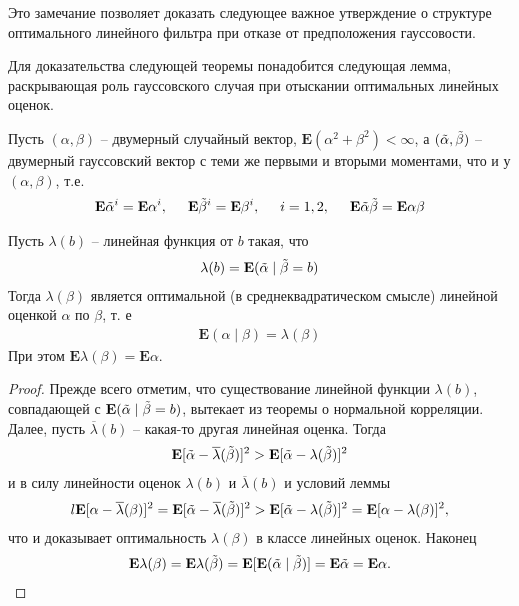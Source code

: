 Это замечание позволяет доказать следующее важное утверждение о
структуре оптимального линейного фильтра при отказе от предположения
гауссовости.

Для доказательства следующей теоремы понадобится следующая лемма, раскрывающая роль гауссовского случая при отыскании оптимальных линейных оценок.

\begin{lemma}\label{lost_minus_lemma_2}
	Пусть $(\alpha, \beta)$ – двумерный случайный вектор, $\mathbf{E} (\alpha^2 + \beta^2) < \infty$, а $(\Tilde{\alpha}, \Tilde{\beta})$ – двумерный гауссовский вектор с теми же первыми и вторыми моментами, что и у $(\alpha, \beta)$, т.е.
	\begin{align*}
	\mathbf{E} \Tilde{\alpha}^i = \mathbf{E} \alpha^i, \hspace{0.5cm} \mathbf{E} \Tilde{\beta}^i = \mathbf{E} \beta^i, \hspace{0.5cm} i = 1,2, \hspace{0.5cm} \mathbf{E}\Tilde{\alpha} \Tilde{\beta} = \mathbf{E}\alpha \beta 
	\end{align*}
	
	Пусть $\lambda(b)$ – линейная функция от $b$ такая, что
	\begin{align*}
	\lambda(b) = \mathbf{E} (\Tilde{\alpha} \mid \Tilde{\beta} = b)
	\end{align*}
	Тогда $\lambda(\beta)$ является оптимальной (в среднеквадратическом смысле)
	линейной оценкой $\alpha$ по $\beta$, т. е
	\begin{align*}
	\mathbf{E} (\alpha \mid \beta) = \lambda(\beta)
	\end{align*}
	При этом $\mathbf{E}\lambda(\beta) = \mathbf{E}\alpha$.
\end{lemma}

\begin{proof}
	Прежде всего отметим, что существование линейной функции $\lambda(b)$, совпадающей с $\mathbf{E} (\Tilde{\alpha} \mid \Tilde{\beta} = b)$, вытекает из теоремы о нормальной корреляции. Далее, пусть $\overline{\lambda}(b)$ – какая-то другая линейная оценка. Тогда
	\begin{align*}
	\mathbf{E} [\Tilde{\alpha} - \overline{\lambda}(\Tilde{\beta})]^2 > \mathbf{E} [\Tilde{\alpha} - \lambda(\Tilde{\beta})]^2
	\end{align*}
	и в силу линейности оценок $\lambda(b)$ и $\overline{\lambda}(b)$ и условий леммы
	\begin{align*}l
	\mathbf{E} [\alpha - \overline{\lambda}(\beta)]^2 = \mathbf{E} [\Tilde{\alpha} - \overline{\lambda}(\Tilde{\beta})]^2 > \mathbf{E} [\Tilde{\alpha} - \lambda(\Tilde{\beta})]^2 = \mathbf{E} [\alpha - \lambda(\beta)]^2,
	\end{align*}
	что и доказывает оптимальность $\lambda(\beta)$ в классе линейных оценок. Наконец
	\begin{align*}
	\mathbf{E}\lambda(\beta) = \mathbf{E}\lambda(\Tilde{\beta}) = \mathbf{E}[\mathbf{E}(\Tilde{\alpha} \mid \Tilde{\beta})] = \mathbf{E}\Tilde{\alpha} = \mathbf{E}\alpha. 
	\end{align*}
\end{proof}

